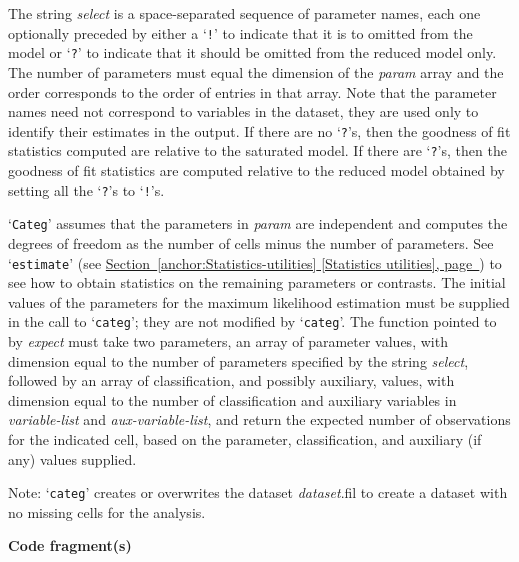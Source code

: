 \documentclass{book}
\newcommand\Texinfocommandstyletextvar[1]{{\normalfont{}\textsl{#1}}}%
\renewcommand{\_}{\Texinfounderscore\discretionary{}{}{}}
\begin{document}
The string \Texinfocommandstyletextvar{select} is a space-separated sequence of parameter
names, each one optionally preceded by either a `\texttt{!}' to indicate that
it is to omitted from the model or `\texttt{?}' to indicate that it should
be omitted from the reduced model only.
The number of parameters must equal the dimension of the \Texinfocommandstyletextvar{param} array
and the order corresponds to the order of entries in that array.
Note that the parameter names need not correspond to
variables in the dataset, they are used only to identify
their estimates in the output.
If there are no `\texttt{?}'s, then the goodness of fit statistics
computed are relative to the saturated model.
If there are `\texttt{?}'s, then the goodness of fit statistics are computed
relative to the reduced model obtained by setting all the `\texttt{?}'s to `\texttt{!}'s.

`\texttt{Categ}' assumes that the parameters in \Texinfocommandstyletextvar{param} are independent and computes
the degrees of freedom as the number of cells minus the number of parameters.
See `\texttt{estimate}' (see \hyperref[anchor:Statistics-utilities]{Section~\ref*{anchor:Statistics-utilities} [Statistics utilities], page~\pageref*{anchor:Statistics-utilities}}) to see how to obtain
statistics on the remaining parameters or contrasts.
The initial values of the parameters for the maximum likelihood estimation
must be supplied in the call to `\texttt{categ}'; they are not modified by `\texttt{categ}'.
The function pointed to by \Texinfocommandstyletextvar{expect} must take two parameters, an array of
parameter values, with dimension equal to the number of parameters
specified by the string \Texinfocommandstyletextvar{select},
followed by an array of classification, and possibly auxiliary, values,
with dimension equal to the number of classification and auxiliary
variables in \Texinfocommandstyletextvar{variable-list} and \Texinfocommandstyletextvar{aux-variable-list}, and return the
expected number of observations for the indicated cell, based on
the parameter, classification, and auxiliary (if any) values supplied.

Note: `\texttt{categ}' creates or overwrites the dataset \Texinfocommandstyletextvar{dataset}.fil to
create a dataset with no missing cells for the analysis.

\noindent{}\textbf{Code fragment(s)}
\end{document}

